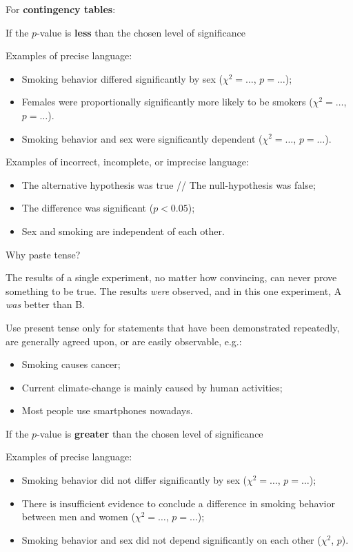 \documentclass[
]{book}
\providecommand{\tightlist}{%
  \setlength{\itemsep}{0pt}\setlength{\parskip}{0pt}}
\begin{document}
For \textbf{contingency tables}:

If the \(p\)-value is \textbf{less} than the chosen level of significance

Examples of precise language:

\begin{itemize}
\tightlist
\item
  Smoking behavior differed significantly by sex (\(\chi^2 = \dots\), \(p = \dots\));
\item
  Females were proportionally significantly more likely to be smokers (\(\chi^2 = \dots\), \(p = \dots\)).
\item
  Smoking behavior and sex were significantly dependent (\(\chi^2 = \dots\), \(p = \dots\)).
\end{itemize}

Examples of incorrect, incomplete, or imprecise language:

\begin{itemize}
\tightlist
\item
  The alternative hypothesis was true // The null-hypothesis was false;
\item
  The difference was significant (\(p < 0.05\));
\item
  Sex and smoking are independent of each other.
\end{itemize}

Why paste tense?

The results of a single experiment, no matter how convincing, can never prove something to be true. The results \emph{were} observed, and in this one experiment, A \emph{was} better than B.

Use present tense only for statements that have been demonstrated repeatedly, are generally agreed upon, or are easily observable, e.g.:

\begin{itemize}
\tightlist
\item
  Smoking causes cancer;
\item
  Current climate-change is mainly caused by human activities;
\item
  Most people use smartphones nowadays.
\end{itemize}

If the \(p\)-value is \textbf{greater} than the chosen level of significance

Examples of precise language:

\begin{itemize}
\tightlist
\item
  Smoking behavior did not differ significantly by sex (\(\chi^2 = \dots\), \(p = \dots\));
\item
  There is insufficient evidence to conclude a difference in smoking behavior between men and women (\(\chi^2 = \dots\), \(p = \dots\));
\item
  Smoking behavior and sex did not depend significantly on each other (\(\chi^2\), \(p\)).
\end{itemize}
\end{document}
